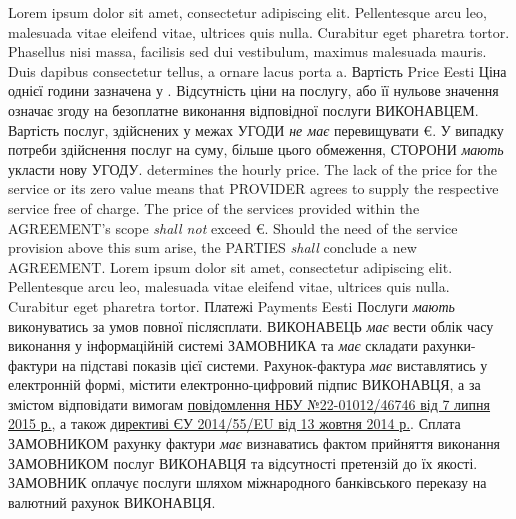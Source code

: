 \begin{Form}
\begin{paracol}{3}
        {Lorem ipsum dolor sit amet, consectetur adipiscing elit. Pellentesque arcu leo, malesuada vitae eleifend vitae, ultrices quis nulla. Curabitur eget pharetra tortor. Phasellus nisi massa, facilisis sed dui vestibulum, maximus malesuada mauris. Duis dapibus consectetur tellus, a ornare lacus porta a.}
      \clause
        {Вартість}
        {Price}
        {Eesti}
        {Ціна однієї години зазначена у . Відсутність ціни на послугу, або її нульове значення означає згоду на безоплатне виконання відповідної послуги ВИКОНАВЦЕМ. Вартість послуг, здійснених у межах УГОДИ \textit{не має} перевищувати  €. У випадку потреби здійснення послуг на суму, більше цього обмеження, СТОРОНИ \textit{мають} укласти нову УГОДУ.}
        { determines the hourly price. The lack of the price for the service or its zero value means that PROVIDER agrees to supply the respective service free of charge. The price of the services provided within the AGREEMENT's scope \textit{shall not} exceed  €. Should the need of the service provision above this sum arise, the PARTIES \textit{shall} conclude a new AGREEMENT.}
        {Lorem ipsum dolor sit amet, consectetur adipiscing elit. Pellentesque arcu leo, malesuada vitae eleifend vitae, ultrices quis nulla. Curabitur eget pharetra tortor.}
      \clause %
        {Платежі}
        {Payments}
        {Eesti}
        {\label{sec:payment}Послуги \textit{мають} виконуватись за умов повної післясплати. ВИКОНАВЕЦЬ \textit{має} вести облік часу виконання у інформаційній системі ЗАМОВНИКА та \textit{має} складати рахунки-фактури на підставі показів цієї системи. Рахунок-фактура \textit{має} виставлятись у електронній формі, містити електронно-цифровий підпис ВИКОНАВЦЯ, а за змістом відповідати вимогам \href{http://bank.gov.ua/doccatalog/document?id=19208488}{повідомлення НБУ №22-01012/46746 від 7 липня 2015 р.}, а також \href{http://eur-lex.europa.eu/legal-content/EN/TXT/?uri=CELEX:32014L0055}{директиві ЄУ 2014/55/EU від 13 жовтня 2014 р.}. Сплата ЗАМОВНИКОМ рахунку фактури \textit{має} визнаватись фактом прийняття виконання ЗАМОВНИКОМ послуг ВИКОНАВЦЯ та відсутності претензій до їх якості. ЗАМОВНИК оплачує послуги шляхом міжнародного банківського переказу на валютний рахунок ВИКОНАВЦЯ.}

\end{paracol}
\end{Form}
